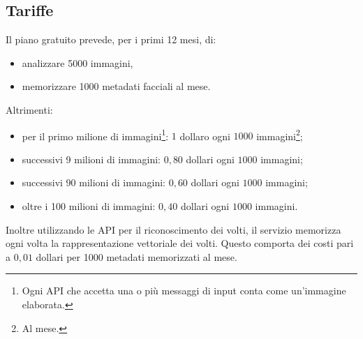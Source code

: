 \subsection{Tariffe}
Il piano gratuito prevede, per i primi 12 mesi, di:
\begin{itemize}
\item analizzare 5000 immagini,
\item memorizzare 1000 metadati facciali al mese.
\end{itemize}
Altrimenti:
\begin{itemize}
\item per il primo milione di immagini\footnote{Ogni API che accetta una o più messaggi di input conta come un'immagine elaborata.}: $1$ dollaro ogni $1000$ immagini\footnote{Al mese.};
\item successivi 9 milioni di immagini: $0,80$ dollari ogni $1000$ immagini;
\item successivi 90 milioni di immagini: $0,60$ dollari ogni $1000$ immagini;
\item oltre i 100 milioni di immagini: $0,40$ dollari ogni $1000$ immagini.
\end{itemize}
Inoltre utilizzando le API per il riconoscimento dei volti, il servizio memorizza ogni volta la rappresentazione vettoriale dei volti. Questo comporta dei costi pari a $0,01$ dollari per 1000 metadati memorizzati al mese.  